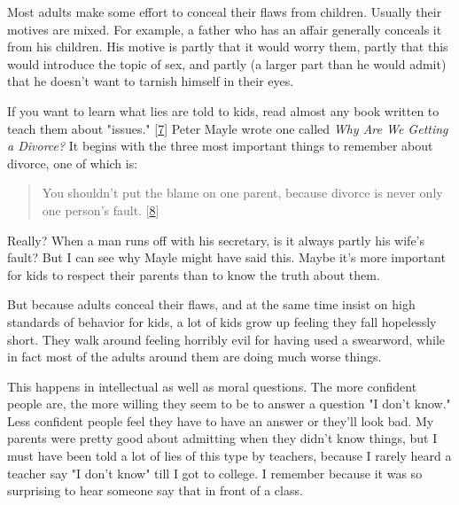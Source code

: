 Most adults make some effort to conceal their
                  flaws from children. Usually their motives are mixed. For
                  example, a father who has an affair generally conceals it from
                  his children. His motive is partly that it would worry them,
                  partly that this would introduce the topic of sex, and partly
                  (a larger part than he would admit) that he doesn't want to
                  tarnish himself in their eyes.

If you want to learn
                  what lies are told to kids, read almost any book written to
                  teach them about "issues."
                  [\href{\#f7n}{7}]
                  Peter Mayle wrote one called
                  \emph{Why Are We Getting a Divorce?} It begins with the three
                  most important things to remember about divorce, one of which
                  is:
                  \begin{quote}

                    You shouldn't put the blame on one parent, because divorce
                    is never only one person's fault.
                    [\href{\#f8n}{8}]
                  
\end{quote}

                  Really? When a man runs off with his secretary, is it always
                  partly his wife's fault? But I can see why Mayle might have
                  said this. Maybe it's more important for kids to respect their
                  parents than to know the truth about them.

But
                  because adults conceal their flaws, and at the same time
                  insist on high standards of behavior for kids, a lot of kids
                  grow up feeling they fall hopelessly short. They walk around
                  feeling horribly evil for having used a swearword, while in
                  fact most of the adults around them are doing much worse
                  things.

This happens in intellectual as well as
                  moral questions. The more confident people are, the more
                  willing they seem to be to answer a question "I don't know."
                  Less confident people feel they have to have an answer or
                  they'll look bad. My parents were pretty good about admitting
                  when they didn't know things, but I must have been told a lot
                  of lies of this type by teachers, because I rarely heard a
                  teacher say "I don't know" till I got to college. I remember
                  because it was so surprising to hear someone say that in front
                  of a class.

